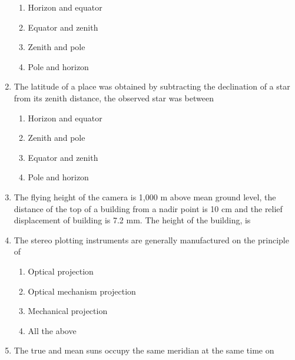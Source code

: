 \documentclass[11pt,a4paper]{article}
\begin{document}
\begin{enumerate}
\begin{enumerate}[label=\Alph*.]
\item{Horizon and equator}
\item{Equator and zenith}
\item{Zenith and pole}
\item{Pole and horizon}
\end{enumerate}
\item{The latitude of a place was obtained by subtracting the declination of a star from its zenith distance, the observed star was between}
\begin{enumerate}[label=\Alph*.]
\item{Horizon and equator}
\item{Zenith and pole}
\item{Equator and zenith}
\item{Pole and horizon}
\end{enumerate}
\item{The flying height of the camera is 1,000 m above mean ground level, the distance of the top of a building from a nadir point is 10 cm and the relief displacement of building is 7.2 mm. The height of the building, is}
\\
\item{The stereo plotting instruments are generally manufactured on the principle of}
\begin{enumerate}[label=\Alph*.]
\item{Optical projection}
\item{Optical mechanism projection}
\item{Mechanical projection}
\item{All the above}
\end{enumerate}
\item{The true and mean suns occupy the same meridian at the same time on}
\\
\end{enumerate}
\end{document}
